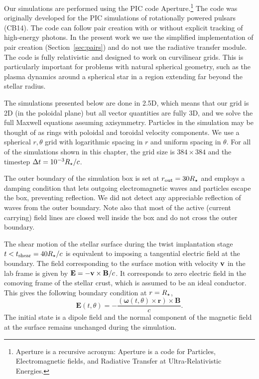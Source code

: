 Our simulations are performed using the PIC code Aperture.\footnote{Aperture is
  a recursive acronym:
  Aperture is a code for Particles, Electromagnetic
  fields, and Radiative Transfer at Ultra-Relativistic Energies.} The code was
originally developed for the PIC simulations of rotationally powered pulsars
(CB14). The code can follow pair creation with or without explicit tracking of
high-energy photons. In the present work we use the simplified implementation of
pair creation (Section~\ref{sec:pairs}) and do not use the radiative transfer
module. The code is fully relativistic and designed to work on curvilinear
grids. This is particularly important for problems with natural spherical
geometry, such as the plasma dynamics around a spherical star in a region
extending far beyond the stellar radius.

The simulations presented below are done in 2.5D, which means that our grid is
2D (in the poloidal plane) but all vector quantities are fully 3D, and we solve
the full Maxwell equations assuming axisymmetry. Particles in the simulation may
be thought of as rings with poloidal and toroidal velocity components. We use a
spherical $r,\theta$ grid with logarithmic spacing in $r$ and uniform spacing in
$\theta$. For all of the simulations shown in this chapter, the grid size is
$384\times 384$ and the timestep $\Delta t = 10^{-3}R_\star/c$.

The outer boundary of the simulation box is set at $r_{\rm out} = 30R_\star$ and employs
a damping condition that lets outgoing electromagnetic waves and particles escape
the box, preventing reflection.
We did not detect any appreciable reflection of waves from the outer boundary.
Note also that most of the active (current carrying) field lines are
closed well inside the box and do not cross the outer boundary.

The shear motion of the stellar surface during the twist implantation stage
$t<t_{\rm shear}=40R_\star/c$ is equivalent to imposing a tangential electric field at the
boundary. The field corresponding to the surface motion with velocity ${\mathbf v}$ in
the lab frame is given by ${\mathbf E}=-{\mathbf v}\times{\mathbf B}/c$. It corresponds to zero electric
field in the comoving frame of the stellar crust, which is assumed to be an
ideal conductor. This gives the following boundary condition at $r=R_\star$,
\begin{equation}
  \label{eq:boundary-condition-e-theta}
  \mathbf{E}(t,\theta) =
  -\frac{( \mathbf{\omega}(t,\theta)\times \mathbf{r})\times \mathbf{B}}{c}.
\end{equation}
The initial state is a dipole field and the normal component of the magnetic field
at the surface remains unchanged during the simulation.


